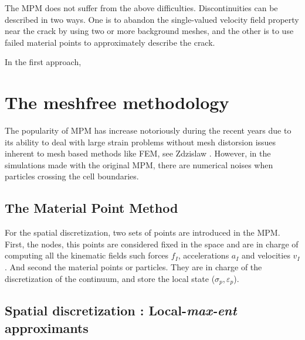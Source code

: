 \documentclass[preprint,12pt,a4paper]{elsarticle}
\begin{document}
The MPM does not suffer from the above difficulties. Discontinuities
can be described in two ways. One is to abandon the single-valued
velocity field property near the crack by using two or more background
meshes, and the other is to use failed material points to
approximately describe the crack.

In the first approach,



\section{The meshfree methodology}
\label{sec:2}

The popularity of MPM has increase notoriously during the recent years
due to its ability to deal with large strain problems without mesh
distorsion issues inherent to mesh based methods like FEM, see
Zdzislaw \cite{Wieckowski2004}. However, in the simulations made with
the original MPM, there are numerical noises when particles crossing
the cell boundaries. 

\subsection{The Material Point Method}
\label{sec:2.1}

For the spatial discretization, two sets of points are introduced in
the MPM. First, the nodes, this points are considered fixed in the space and are in charge of
computing all the kinematic fields such forces $f_I$, accelerations $a_I$ and
velocities $v_I$. And second the material points or particles. They are in
charge of the discretization of the continuum, and store the local state ($\sigma_p, \varepsilon_p$).

\subsection{Spatial discretization : Local-\textit{max-ent} approximants}
\label{sec:2.2}
\end{document}
